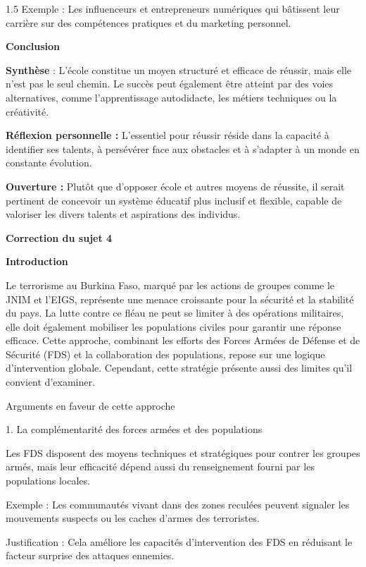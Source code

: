 \documentclass[12pt]{article}
\begin{document}
\begin{spacing}{1.5}
Exemple : Les influenceurs et entrepreneurs numériques qui bâtissent leur carrière sur des compétences pratiques et du marketing personnel.

\textbf{ Conclusion}

\textbf{ Synthèse }: L'école constitue un moyen structuré et efficace de réussir, mais elle n'est pas le seul chemin. Le succès peut également être atteint par des voies alternatives, comme l'apprentissage autodidacte, les métiers techniques ou la créativité.

\textbf{Réflexion personnelle :} L'essentiel pour réussir réside dans la capacité à identifier ses talents, à persévérer face aux obstacles et à s'adapter à un monde en constante évolution.

\textbf{ Ouverture :} Plutôt que d'opposer école et autres moyens de réussite, il serait pertinent de concevoir un système éducatif plus inclusif et flexible, capable de valoriser les divers talents et aspirations des individus.






\quad

\textbf{Correction du sujet 4}


\textbf{ Introduction}

Le terrorisme au Burkina Faso, marqué par les actions de groupes comme le JNIM et l’EIGS, représente une menace croissante pour la sécurité et la stabilité du pays. La lutte contre ce fléau ne peut se limiter à des opérations militaires, elle doit également mobiliser les populations civiles pour garantir une réponse efficace. Cette approche, combinant les efforts des Forces Armées de Défense et de Sécurité (FDS) et la collaboration des populations, repose sur une logique d'intervention globale. Cependant, cette stratégie présente aussi des limites qu'il convient d'examiner.

Arguments en faveur de cette approche

1. La complémentarité des forces armées et des populations

Les FDS disposent des moyens techniques et stratégiques pour contrer les groupes armés, mais leur efficacité dépend aussi du renseignement fourni par les populations locales.

Exemple : Les communautés vivant dans des zones reculées peuvent signaler les mouvements suspects ou les caches d'armes des terroristes.

Justification : Cela améliore les capacités d'intervention des FDS en réduisant le facteur surprise des attaques ennemies.


\end{spacing}
\end{document}

